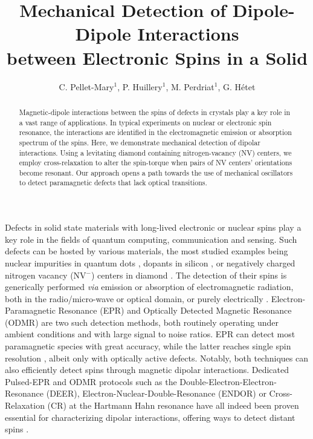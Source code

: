 \documentclass[preprintnumbers,amsmath,amssymb,superscriptaddress,twocolumn,showpacs]{revtex4-1}
\begin{document}
\title{Mechanical Detection of Dipole-Dipole Interactions \\between Electronic Spins in a Solid}

\author{C. Pellet-Mary$^1$, P. Huillery$^1$, M. Perdriat$^1$, G. H\'etet} 


\begin{abstract}
Magnetic-dipole interactions between the spins of defects in crystals play a key role in a vast range of applications. In typical experiments on nuclear or electronic spin resonance, the interactions are identified in the electromagnetic emission or absorption spectrum of the spins.
Here, we demonstrate mechanical detection of dipolar interactions. 
Using a levitating diamond containing nitrogen-vacancy (NV) centers, we employ cross-relaxation to alter 
the spin-torque when pairs of NV centers' orientations become resonant.
Our approach opens a path towards the use of mechanical oscillators to detect paramagnetic defects that lack optical transitions. 
\end{abstract}

\maketitle

Defects in solid state materials with long-lived electronic or nuclear spins play a key role in the fields of quantum computing, communication and sensing. 
Such defects can be hosted by various materials, the most studied examples being nuclear impurities in quantum dots \cite{Qdots}, dopants in silicon \cite{Zwanenburg}, or negatively charged nitrogen vacancy (NV$^-$) centers in diamond \cite{Doherty}.
The detection of their spins is generically performed {\it via} emission or absorption of electromagnetic radiation, both in the radio/micro-wave or optical domain, or purely electrically \cite{Zwanenburg, Hopper}.
Electron-Paramagnetic Resonance (EPR) and Optically Detected Magnetic Resonance (ODMR) are two such detection methods, both routinely operating under ambient conditions and with large signal to noise ratios.
EPR can detect most paramagnetic species with great accuracy, while the latter reaches single spin resolution \cite{Wrachtrup1}, albeit only with optically active defects.
Notably, both techniques can also efficiently detect spins through magnetic dipolar interactions. 
Dedicated Pulsed-EPR \cite{Mims} and ODMR protocols such as the Double-Electron-Electron-Resonance (DEER), Electron-Nuclear-Double-Resonance (ENDOR) or Cross-Relaxation (CR) at the Hartmann Hahn resonance have all indeed been proven essential for characterizing dipolar interactions, offering ways to detect distant spins \cite{Mamin}.
\end{document}
